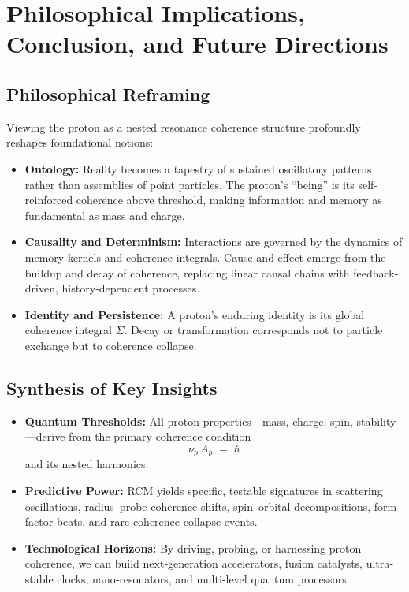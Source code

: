 \section{Philosophical Implications, Conclusion, and Future Directions}

\subsection{Philosophical Reframing}
Viewing the proton as a nested resonance coherence structure profoundly reshapes foundational notions:
\begin{itemize}
  \item \textbf{Ontology:} Reality becomes a tapestry of sustained oscillatory patterns rather than assemblies of point particles.  The proton’s “being” is its self‐reinforced coherence above threshold, making information and memory as fundamental as mass and charge.
  \item \textbf{Causality and Determinism:} Interactions are governed by the dynamics of memory kernels and coherence integrals.  Cause and effect emerge from the buildup and decay of coherence, replacing linear causal chains with feedback‐driven, history‐dependent processes.
  \item \textbf{Identity and Persistence:} A proton’s enduring identity is its global coherence integral \(\Sigma\).  Decay or transformation corresponds not to particle exchange but to coherence collapse.
\end{itemize}

\subsection{Synthesis of Key Insights}
\begin{itemize}
  \item \textbf{Quantum Thresholds:} All proton properties—mass, charge, spin, stability—derive from the primary coherence condition
  \[
    \nu_p\,A_p \;=\;\hbar
  \]
  and its nested harmonics.
  \item \textbf{Predictive Power:} RCM yields specific, testable signatures in scattering oscillations, radius–probe coherence shifts, spin–orbital decompositions, form‐factor beats, and rare coherence‐collapse events.
  \item \textbf{Technological Horizons:} By driving, probing, or harnessing proton coherence, we can build next‐generation accelerators, fusion catalysts, ultra‐stable clocks, nano‐resonators, and multi‐level quantum processors.
\end{itemize}

